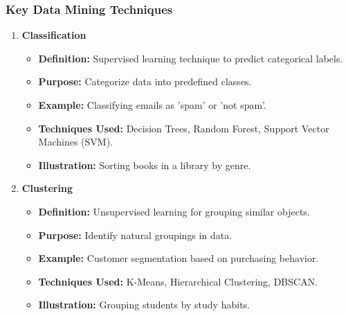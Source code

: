 \documentclass[aspectratio=169]{beamer}
\begin{document}
\begin{frame}[fragile]
  \frametitle{Key Data Mining Techniques}
  \begin{enumerate}
    \item \textbf{Classification}
      \begin{itemize}
        \item \textbf{Definition:} Supervised learning technique to predict categorical labels.
        \item \textbf{Purpose:} Categorize data into predefined classes.
        \item \textbf{Example:} Classifying emails as 'spam' or 'not spam'.
        \item \textbf{Techniques Used:} Decision Trees, Random Forest, Support Vector Machines (SVM).
        \item \textbf{Illustration:} Sorting books in a library by genre.
      \end{itemize}
    
    \item \textbf{Clustering}
      \begin{itemize}
        \item \textbf{Definition:} Unsupervised learning for grouping similar objects.
        \item \textbf{Purpose:} Identify natural groupings in data.
        \item \textbf{Example:} Customer segmentation based on purchasing behavior.
        \item \textbf{Techniques Used:} K-Means, Hierarchical Clustering, DBSCAN.
        \item \textbf{Illustration:} Grouping students by study habits.
      \end{itemize}
  \end{enumerate}
\end{frame}
\end{document}
